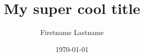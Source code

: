 \documentclass[letterpaper, 12pt,english]{report}
\title{My super cool title}
\author{Firstname Lastname}
\date{\monthyeardate\today}
\begin{document}
	
    
    
    
    
    \tableofcontents
    \listoffigures
    \listoftables
    \setcounter{page}{1}

    

	

	

    \begin{appendices}

        

        

    \end{appendices}
\end{document}
